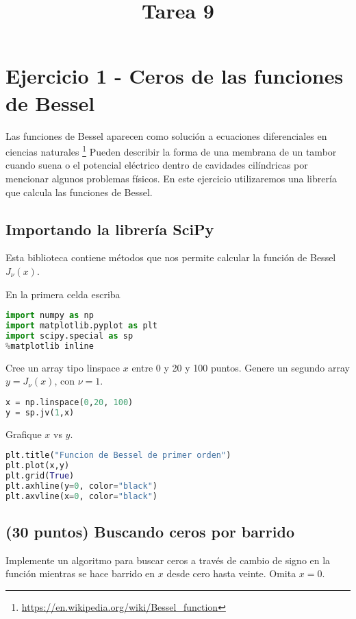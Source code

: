 \documentclass{article}
\title{Tarea 9}
\begin{document}
\maketitle

\section{Ejercicio 1 - Ceros de las funciones de Bessel}

Las funciones de Bessel aparecen como soluci\'on a ecuaciones diferenciales 
en ciencias naturales 
\footnote{\url{https://en.wikipedia.org/wiki/Bessel_function}}
Pueden describir la forma de una membrana de un tambor cuando suena o
el potencial eléctrico dentro de cavidades cilíndricas por mencionar
algunos problemas físicos. 
En este ejercicio utilizaremos una librería que calcula las funciones de Bessel.

\subsection{Importando la librería SciPy}
Esta biblioteca contiene m\'etodos que nos permite calcular 
la funci\'on de Bessel $J_\nu(x)$. 

En la primera celda escriba
\begin{lstlisting}[language=Python]
import numpy as np
import matplotlib.pyplot as plt
import scipy.special as sp
%matplotlib inline
\end{lstlisting}

Cree un array tipo linspace $x$ entre 0 y 20 y 100 puntos.
Genere un segundo array $y=J_\nu(x)$, con $\nu = 1$.
\begin{lstlisting}[language=Python]
x = np.linspace(0,20, 100)
y = sp.jv(1,x)
\end{lstlisting}

Grafique $x$ vs $y$.
\begin{lstlisting}[language=Python]
plt.title("Funcion de Bessel de primer orden")
plt.plot(x,y)
plt.grid(True)
plt.axhline(y=0, color="black")
plt.axvline(x=0, color="black")
\end{lstlisting}

\subsection{(30 puntos) Buscando ceros por barrido}

Implemente un algoritmo para buscar ceros a través de cambio de signo
en la función mientras se hace barrido en $x$ desde cero hasta veinte.
Omita $x=0$.
\end{document}
